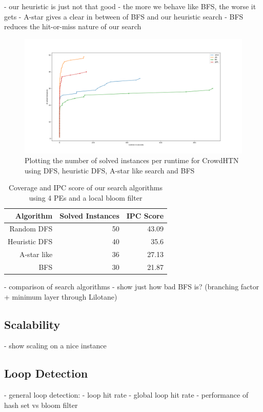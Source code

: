 - our heuristic is just not that good
- the more we behave like BFS, the worse it gets
	- A-star gives a clear in between of BFS and our heuristic search
- BFS reduces the hit-or-miss nature of our search
\begin{figure}
	\caption{Plotting the number of solved instances per runtime for CrowdHTN using DFS, heuristic DFS, A-star like search and BFS}
	\label{figure: algorithm eval}
	\centering
	\includegraphics[width=\textwidth]{images/prelim/algorithms.png}
\end{figure}
\begin{table}
	\caption{Coverage and IPC score of our search algorithms using 4 PEs and a local bloom filter}
	\label{table: algorithm eval}
	\centering
	\begin{tabular}{| r | r | r |}
		\hline
		Algorithm 		& Solved Instances & IPC Score \\
		\hline
		Random DFS 		& 50	& 43.09 \\
		Heuristic DFS 	& 40	& 35.6	\\
		A-star like 	& 36	& 27.13 \\
		BFS 			& 30	& 21.87	\\
		\hline
	\end{tabular}
\end{table}

- comparison of search algorithms
- show just how bad BFS is? (branching factor + minimum layer through Lilotane)

\subsection{Scalability}
- show scaling on a nice instance

\subsection{Loop Detection}
- general loop detection:
- loop hit rate
- global loop hit rate
- performance of hash set vs bloom filter

